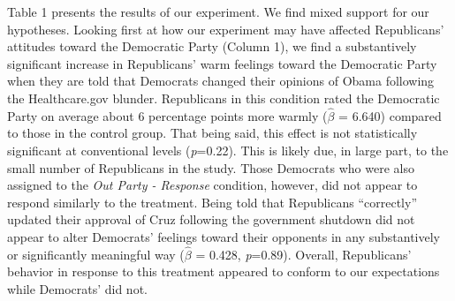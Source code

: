 \documentclass[12pt, letterpaper]{article}
\begin{document}
Table 1 presents the results of our experiment. We find mixed support for our hypotheses. Looking first at how our experiment may have affected Republicans' attitudes toward the Democratic Party (Column 1), we find a substantively significant increase in Republicans' warm feelings toward the Democratic Party when they are told that Democrats changed their opinions of Obama following the Healthcare.gov blunder. Republicans in this condition rated the Democratic Party on average about 6 percentage points more warmly ($\hat{\beta}$ = 6.640) compared to those in the control group. That being said, this effect is not statistically significant at conventional levels (\textit{p}=0.22). This is likely due, in large part, to the small number of Republicans in the study. Those Democrats who were also assigned to the \textit{Out Party - Response} condition, however, did not appear to respond similarly to the treatment. Being told that Republicans  ``correctly'' updated their approval of Cruz following the government shutdown did not appear to alter Democrats' feelings toward their opponents in any substantively or significantly meaningful way ($\hat{\beta}$ = 0.428, \textit{p}=0.89). Overall, Republicans' behavior in response to this treatment appeared to conform to our expectations while Democrats' did not.
\end{document}
